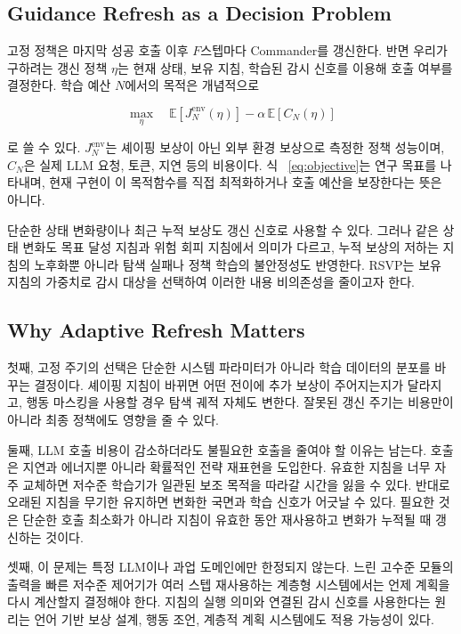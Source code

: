 \subsection{Guidance Refresh as a Decision Problem}

고정 정책은 마지막 성공 호출 이후 $F$스텝마다 Commander를 갱신한다. 반면 우리가
구하려는 갱신 정책 $\eta$는 현재 상태, 보유 지침, 학습된 감시 신호를 이용해 호출
여부를 결정한다. 학습 예산 $N$에서의 목적은 개념적으로

\begin{equation}
\max_{\eta}\quad
\mathbb E[J_N^{\mathrm{env}}(\eta)]
-\alpha\,\mathbb E[C_N(\eta)]
\label{eq:objective}
\end{equation}

로 쓸 수 있다. $J_N^{\mathrm{env}}$는 셰이핑 보상이 아닌 외부 환경 보상으로 측정한
정책 성능이며, $C_N$은 실제 LLM 요청, 토큰, 지연 등의 비용이다. 식
~\eqref{eq:objective}는 연구 목표를 나타내며, 현재 구현이 이 목적함수를 직접
최적화하거나 호출 예산을 보장한다는 뜻은 아니다.

단순한 상태 변화량이나 최근 누적 보상도 갱신 신호로 사용할 수 있다. 그러나 같은 상태
변화도 목표 달성 지침과 위험 회피 지침에서 의미가 다르고, 누적 보상의 저하는 지침의
노후화뿐 아니라 탐색 실패나 정책 학습의 불안정성도 반영한다. RSVP는 보유 지침의
가중치로 감시 대상을 선택하여 이러한 내용 비의존성을 줄이고자 한다.

\subsection{Why Adaptive Refresh Matters}

첫째, 고정 주기의 선택은 단순한 시스템 파라미터가 아니라 학습 데이터의 분포를
바꾸는 결정이다. 셰이핑 지침이 바뀌면 어떤 전이에 추가 보상이 주어지는지가 달라지고,
행동 마스킹을 사용할 경우 탐색 궤적 자체도 변한다. 잘못된 갱신 주기는 비용만이 아니라
최종 정책에도 영향을 줄 수 있다.

둘째, LLM 호출 비용이 감소하더라도 불필요한 호출을 줄여야 할 이유는 남는다. 호출은
지연과 에너지뿐 아니라 확률적인 전략 재표현을 도입한다. 유효한 지침을 너무 자주
교체하면 저수준 학습기가 일관된 보조 목적을 따라갈 시간을 잃을 수 있다. 반대로 오래된
지침을 무기한 유지하면 변화한 국면과 학습 신호가 어긋날 수 있다. 필요한 것은 단순한
호출 최소화가 아니라 지침이 유효한 동안 재사용하고 변화가 누적될 때 갱신하는 것이다.

셋째, 이 문제는 특정 LLM이나 과업 도메인에만 한정되지 않는다. 느린 고수준 모듈의 출력을
빠른 저수준 제어기가 여러 스텝 재사용하는 계층형 시스템에서는 언제 계획을 다시
계산할지 결정해야 한다. 지침의 실행 의미와 연결된 감시 신호를 사용한다는 원리는
언어 기반 보상 설계, 행동 조언, 계층적 계획 시스템에도 적용 가능성이 있다.
